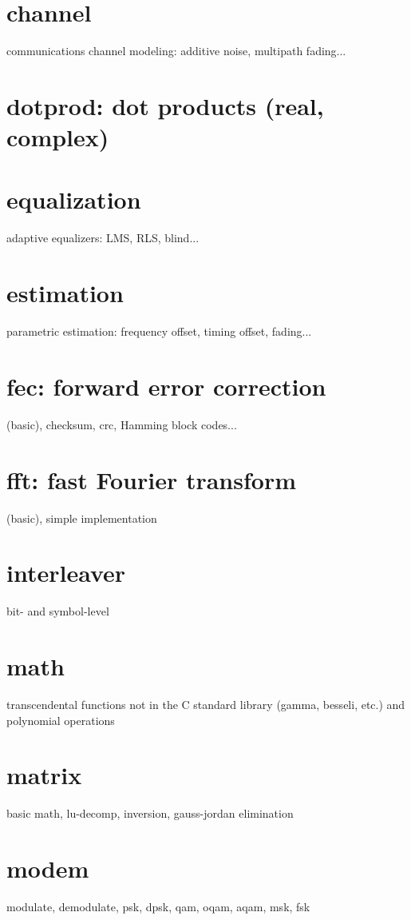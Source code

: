 \documentclass[11pt,twoside]{report}
\begin{document}




\section{channel}
communications channel modeling: additive noise, multipath fading...
\section{dotprod: dot products (real, complex)}
\section{equalization}
adaptive equalizers: LMS, RLS, blind...
\section{estimation}
parametric estimation: frequency offset, timing offset, fading...
\section{fec: forward error correction}
(basic), checksum, crc, Hamming block codes...
\section{fft: fast Fourier transform}
(basic), simple implementation



\section{interleaver}
bit- and symbol-level
\section{math}
transcendental functions not in the C standard library (gamma, besseli, etc.)
and polynomial operations
\section{matrix}
basic math, lu-decomp, inversion, gauss-jordan elimination
\section{modem}
modulate, demodulate, psk, dpsk, qam, oqam, aqam, msk, fsk
\end{document}
